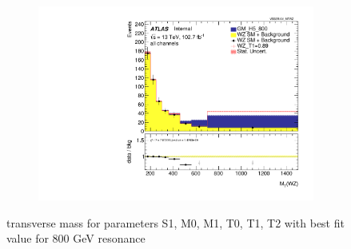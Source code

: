 \documentclass[../Bachelorarbeit.tex]{subfiles}
\begin{document}
\begin{figure}[h]
\begin{subfigure}{0.3\textwidth}
    \end{subfigure}
    \begin{subfigure}{0.3\textwidth}
        \includegraphics[width=\textwidth]{Plots/ALL_MTWZ_final/GM_H5_800/T1/2022-05-07/VBSSR/all_VV_MTWZ.pdf}
    \end{subfigure}

    \caption{transverse mass for parameters S1, M0, M1, T0, T1, T2 with best fit value for 800 GeV resonance}
    \label{fig:all_mtwz_800}
\end{figure}
\end{document}
